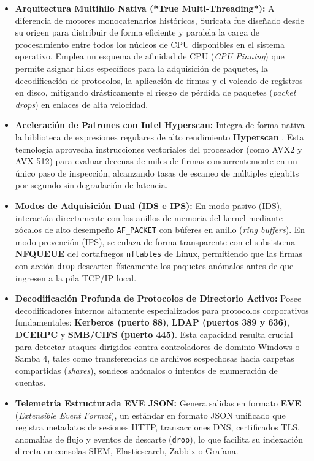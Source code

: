 \begin{itemize}
  \item \textbf{Arquitectura Multihilo Nativa (*True Multi-Threading*):} A diferencia de motores monocatenarios históricos, Suricata fue diseñado desde su origen para distribuir de forma eficiente y paralela la carga de procesamiento entre todos los núcleos de CPU disponibles en el sistema operativo. Emplea un esquema de afinidad de CPU (\textit{CPU Pinning}) que permite asignar hilos específicos para la adquisición de paquetes, la decodificación de protocolos, la aplicación de firmas y el volcado de registros en disco, mitigando drásticamente el riesgo de pérdida de paquetes (\textit{packet drops}) en enlaces de alta velocidad.
  \item \textbf{Aceleración de Patrones con Intel Hyperscan:} Integra de forma nativa la biblioteca de expresiones regulares de alto rendimiento \textbf{Hyperscan} \citep{intel_hyperscan_2019}. Esta tecnología aprovecha instrucciones vectoriales del procesador (como AVX2 y AVX-512) para evaluar decenas de miles de firmas concurrentemente en un único paso de inspección, alcanzando tasas de escaneo de múltiples gigabits por segundo sin degradación de latencia.
  \item \textbf{Modos de Adquisición Dual (IDS e IPS):} En modo pasivo (IDS), interactúa directamente con los anillos de memoria del kernel mediante zócalos de alto desempeño \texttt{AF\_PACKET} con búferes en anillo (\textit{ring buffers}). En modo prevención (IPS), se enlaza de forma transparente con el subsistema \textbf{NFQUEUE} del cortafuegos \texttt{nftables} de Linux, permitiendo que las firmas con acción \texttt{drop} descarten físicamente los paquetes anómalos antes de que ingresen a la pila TCP/IP local.
  \item \textbf{Decodificación Profunda de Protocolos de Directorio Activo:} Posee decodificadores internos altamente especializados para protocolos corporativos fundamentales: \textbf{Kerberos (puerto 88)}, \textbf{LDAP (puertos 389 y 636)}, \textbf{DCERPC} y \textbf{SMB/CIFS (puerto 445)}. Esta capacidad resulta crucial para detectar ataques dirigidos contra controladores de dominio Windows o Samba 4, tales como transferencias de archivos sospechosas hacia carpetas compartidas (\textit{shares}), sondeos anómalos o intentos de enumeración de cuentas.
  \item \textbf{Telemetría Estructurada EVE JSON:} Genera salidas en formato \textbf{EVE} (\textit{Extensible Event Format}), un estándar en formato JSON unificado que registra metadatos de sesiones HTTP, transacciones DNS, certificados TLS, anomalías de flujo y eventos de descarte (\texttt{drop}), lo que facilita su indexación directa en consolas SIEM, Elasticsearch, Zabbix o Grafana.
\end{itemize}


